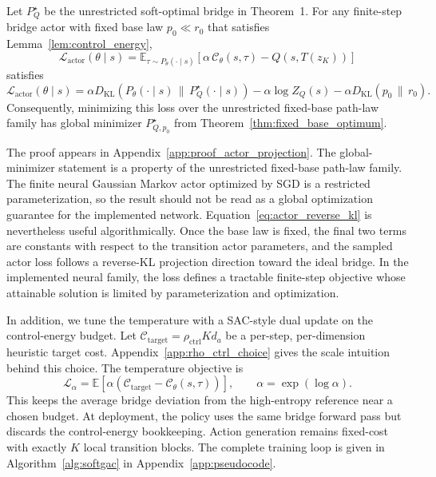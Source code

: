 \documentclass[11pt]{article}
\begin{document}
\begin{proposition}
\label{prop:actor_reverse_kl}
Let $P_Q^\star$ be the unrestricted soft-optimal bridge in Theorem~1. For any finite-step bridge actor with fixed base law $p_0\ll r_0$ that satisfies Lemma~\ref{lem:control_energy},
\begin{equation}
  \mathcal L_{\mathrm{actor}}(\theta\mid s)
  =
  \mathbb E_{\tau\sim P_\theta(\cdot\mid s)}
  \left[
    \alpha\,\mathcal C_\theta(s,\tau)
    -
    Q(s,T(z_K))
  \right]
\end{equation}
satisfies
\begin{equation}
  \mathcal L_{\mathrm{actor}}(\theta\mid s)
  =
  \alpha
  D_{\mathrm{KL}}
  \left(
    P_\theta(\cdot\mid s)
    \,\|\,P_Q^\star(\cdot\mid s)
  \right)
  -
  \alpha\log Z_Q(s)
  -
  \alpha
  D_{\mathrm{KL}}
  \left(
    p_0
    \,\|\,
    r_0
  \right).
  \label{eq:actor_reverse_kl}
\end{equation}
Consequently, minimizing this loss over the unrestricted fixed-base path-law family has global minimizer $P_{Q,p_0}^\star$ from Theorem~\ref{thm:fixed_base_optimum}.
\end{proposition}
The proof appears in Appendix~\ref{app:proof_actor_projection}. The global-minimizer statement is a property of the unrestricted fixed-base path-law family. The finite neural Gaussian Markov actor optimized by SGD is a restricted parameterization, so the result should not be read as a global optimization guarantee for the implemented network. Equation~\eqref{eq:actor_reverse_kl} is nevertheless useful algorithmically. Once the base law is fixed, the final two terms are constants with respect to the transition actor parameters, and the sampled actor loss follows a reverse-KL projection direction toward the ideal bridge. In the implemented neural family, the loss defines a tractable finite-step objective whose attainable solution is limited by parameterization and optimization. 

In addition, we tune the temperature with a SAC-style dual update on the control-energy budget. Let $\mathcal C_{\mathrm{target}} = \rho_{\mathrm{ctrl}} K d_a$ be a per-step, per-dimension heuristic target cost. Appendix~\ref{app:rho_ctrl_choice} gives the scale intuition behind this choice. The temperature objective is
\begin{equation}
  \mathcal L_\alpha
  =
  \mathbb E
  \left[
    \alpha
    \left(
      \mathcal C_{\mathrm{target}}
      -
      \mathcal C_\theta(s,\tau)
    \right)
  \right],
  \qquad
  \alpha=\exp(\log\alpha).
  \label{eq:alpha_loss}
\end{equation}
This keeps the average bridge deviation from the high-entropy reference near a chosen budget. At deployment, the policy uses the same bridge forward pass but discards the control-energy bookkeeping. Action generation remains fixed-cost with exactly $K$ local transition blocks. The complete training loop is given in Algorithm~\ref{alg:softgac} in Appendix~\ref{app:pseudocode}.
\end{document}
